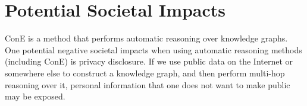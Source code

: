 \documentclass{article}
\begin{document}
\section{Potential Societal Impacts}
ConE is a method that performs automatic reasoning  over knowledge graphs. One potential negative societal impacts when using automatic reasoning methods (including ConE) is privacy disclosure. If we use public data on the Internet or somewhere else to construct a knowledge graph, and then perform multi-hop reasoning over it, personal information that one does not want to make public may be exposed.
\end{document}
